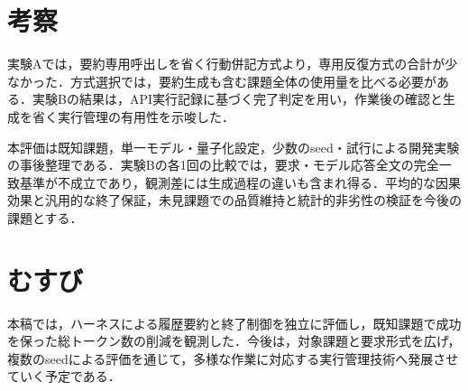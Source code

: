 \documentclass[letter]{ieicej}
\begin{document}
\section{考察}

実験Aでは，要約専用呼出しを省く行動併記方式より，専用反復方式の合計が少なかった．方式選択では，要約生成も含む課題全体の使用量を比べる必要がある．実験Bの結果は，API実行記録に基づく完了判定を用い，作業後の確認と生成を省く実行管理の有用性を示唆した．

本評価は既知課題，単一モデル・量子化設定，少数のseed・試行による開発実験の事後整理である．実験Bの各1回の比較では，要求・モデル応答全文の完全一致基準が不成立であり，観測差には生成過程の違いも含まれ得る．平均的な因果効果と汎用的な終了保証，未見課題での品質維持と統計的非劣性の検証を今後の課題とする．

\section{むすび}

本稿では，ハーネスによる履歴要約と終了制御を独立に評価し，既知課題で成功を保った総トークン数の削減を観測した．今後は，対象課題と要求形式を広げ，複数のseedによる評価を通じて，多様な作業に対応する実行管理技術へ発展させていく予定である．


\end{document}
